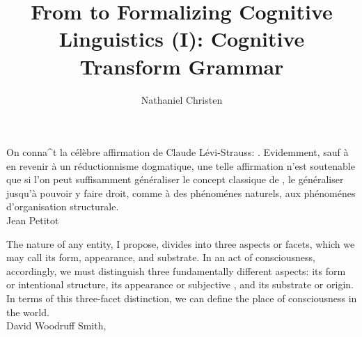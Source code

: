 \documentclass[10pt,twocolumn]{article}
\begin{document}
\title{From  to 
Formalizing Cognitive Linguistics (I): Cognitive Transform Grammar}
\author{Nathaniel Christen}

\newsavebox{\qboxi}
\newsavebox{\qboxii}

\begin{lrbox}{\qboxi}
\begin{frquote}
On conna\^{\inodot}t la c\'{e}l\`{e}bre 
affirmation de Claude L\'{e}vi-Strauss:
.  Evidemment, sauf 
\`{a} en revenir \`{a} un r\'{e}ductionnisme dogmatique, une telle
affirmation n'est soutenable que si l'on peut suffisamment 
g\'{e}n\'{e}raliser le concept
classique de , 
le g\'{e}n\'{e}raliser jusqu'\`{a} pouvoir y faire droit, 
comme \`{a} des ph\'{e}nom\'{e}nes naturels, aux 
ph\'{e}nom\'{e}nes d'organisation structurale. 
\\ \longdash{} Jean Petitot \cite[p. 1]{PetitotSyntaxe}
\end{frquote}
\end{lrbox}

\begin{lrbox}{\qboxii}
\begin{frquote}
The nature of any entity, I propose, divides into three aspects 
or facets, which we may call its form, appearance, and substrate.  
In an act of consciousness, accordingly, we must distinguish three 
fundamentally different aspects: its form or intentional structure, 
its appearance or subjective , and its substrate or 
origin.  In terms of this three-facet distinction, we can define 
the place of consciousness in the world.
\\ \longdash{} David Woodruff Smith, \cite[p. 11]{DavidWoodruffSmith}
\end{frquote}
\end{lrbox}
\end{document}
